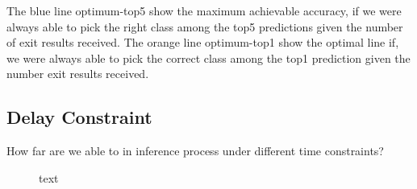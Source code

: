 The blue line optimum-top5 show the maximum achievable accuracy, if we were always able to pick the right class among the top5 predictions given the number of exit results received. The orange line optimum-top1 show the optimal line if, we were always able to pick the correct class among the top1 prediction given the number exit results received.

\subsection{Delay Constraint}

How far are we able to in inference process under different time constraints? 

\begin{figure}
	\centering
	\hfill
	\caption[short text]{text}
	\label{fig:exit-reached}
\end{figure}

